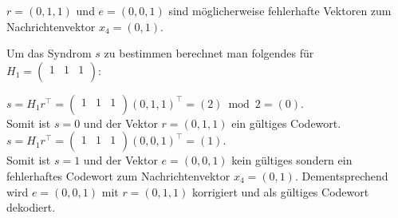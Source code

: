 \begin{Beispiel}[Dekodierung]
        $r = (0,1,1)$ und $e = (0,0,1)$ sind möglicherweise fehlerhafte Vektoren zum Nachrichtenvektor 
        $x_4 = (0,1)$.
        
        Um das Syndrom $s$ zu bestimmen berechnet man folgendes für  $H_1=\left( \begin{array}{rrr}
            1 & 1 & 1 \\
           \end{array}\right) 
        $:
        
        $s = H_1r^\intercal = $$\left( \begin{array}{rrr}
            1 & 1 & 1 \\
           \end{array}\right) 
        $$(0,1,1)^\intercal = (2)\bmod 2= (0).$\\
        
        Somit ist $s = 0$ und der Vektor $r = (0,1,1)$ ein gültiges Codewort.\\
        $s = H_1r^\intercal = $$\left( \begin{array}{rrr}
            1 & 1 & 1 \\
           \end{array}\right) 
        $$(0,0,1)^\intercal = (1).$\\
        
        Somit ist $s = 1$ und der Vektor $e = (0,0,1)$ kein gültiges sondern ein fehlerhaftes Codewort zum Nachrichtenvektor 
        $x_4 = (0,1)$. Dementsprechend wird $e = (0,0,1)$ mit $r = (0,1,1)$ korrigiert und als gültiges Codewort dekodiert.\\
\end{Beispiel}
    
